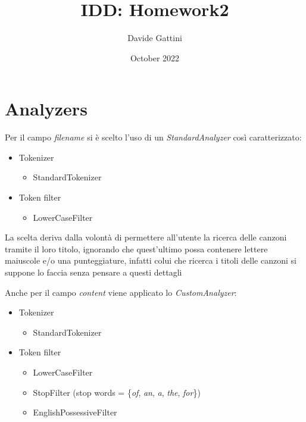 \documentclass{article}
\title{IDD: Homework2}
\author{Davide Gattini}
\date{October 2022}
\begin{document}
\maketitle

\section{Analyzers}
Per il campo \textit{filename} si è scelto l'uso di un \textit{StandardAnalyzer} così caratterizzato:
\begin{itemize}
	\item Tokenizer
	\begin{itemize}
		\item StandardTokenizer
	\end{itemize}
	\item Token filter
	\begin{itemize}
		\item LowerCaseFilter
	\end{itemize}
\end{itemize}

La scelta deriva dalla volontà di permettere all'utente la ricerca delle canzoni tramite il loro titolo, ignorando che quest'ultimo possa contenere lettere maiuscole e/o una punteggiature, infatti colui che ricerca i titoli delle canzoni si suppone lo faccia senza pensare a questi dettagli \begin{comment}e qualora non si facessero queste considerazioni, i documenti cui titoli hanno punteggiatura o maiuscole, non verranno trovati dal programma a meno che l'utente non sappia dove esse si trovano. \end{comment}

Anche per il campo \textit{content} viene applicato lo \textit{CustomAnalyzer}:
\begin{itemize}
	\item Tokenizer
	\begin{itemize}
		\item StandardTokenizer
	\end{itemize}
	\item Token filter
	\begin{itemize}
		\item LowerCaseFilter
		\item StopFilter (stop words = \{\textit{of}, \textit{an}, \textit{a}, \textit{the}, \textit{for}\})
        \item EnglishPossessiveFilter
	\end{itemize}
\end{itemize}
\end{document}
